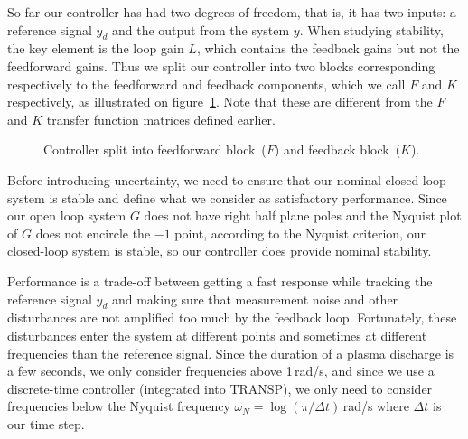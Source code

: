 \documentclass[12pt,lot, lof]{puthesis}
\begin{document}
So far our controller has had two degrees of freedom, that is, it has two inputs:
a reference signal $y_d$ and the output from the system $y$.
When studying stability, the key element is the loop gain $L$, which contains the feedback gains but not the feedforward gains.
Thus we split our controller into two blocks corresponding respectively to the feedforward and feedback components,
which we call $F$ and $K$ respectively, as illustrated on figure~\ref{fig:split_controller}.
Note that these are different from the $F$ and $K$ transfer function matrices defined earlier.

\begin{figure}[htbp]
	\centering
	\caption{Controller split into feedforward block~($F$) and feedback block~($K$).}
	\label{fig:split_controller}
\end{figure}

Before introducing uncertainty, we need to ensure that our nominal closed-loop system is stable and define what we consider as satisfactory performance.
Since our open loop system $G$ does not have right half plane poles and the Nyquist plot of $G$ does not encircle the $-1$ point, according to the Nyquist criterion, our closed-loop system is stable, so our controller does provide nominal stability.

Performance is a trade-off between getting a fast response while tracking the reference signal $y_d$ and making sure that measurement noise and other disturbances are not amplified too much by the feedback loop.
Fortunately, these disturbances enter the system at different points and sometimes at different frequencies than the reference signal.
Since the duration of a plasma discharge is a few seconds, we only consider frequencies above 1\,rad/s,
and since we use a discrete-time controller (integrated into TRANSP), we only need to consider frequencies below the Nyquist frequency $\omega_N = \log(\pi/\Delta t)$\,rad/s where $\Delta t$ is our time step.
\end{document}
